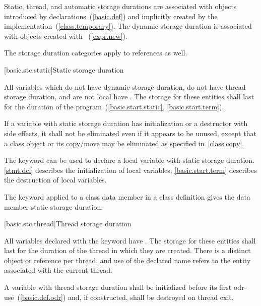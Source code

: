\pnum
{}%
%
%
%
Static, thread, and automatic storage durations are associated with objects
introduced by declarations~(\ref{basic.def}) and implicitly created by
the implementation~(\ref{class.temporary}). The dynamic storage duration
is associated with objects created with 
~(\ref{expr.new}).

\pnum
The storage duration categories apply to references as well.

[basic.stc.static]{Static storage duration}

\pnum
{}%
All variables which do not have dynamic storage duration, do not have thread
storage duration, and are not local
have . The
storage for these entities shall last for the duration of the
program~(\ref{basic.start.static}, \ref{basic.start.term}).

\pnum
If a variable with static storage duration has initialization or a
destructor with side effects, it shall not be eliminated even if it
appears to be unused, except that a class object or its copy/move may be
eliminated as specified in~\ref{class.copy}.

\pnum
{}%
The keyword  can be used to declare a local variable with
static storage duration. \enternote \ref{stmt.dcl} describes the
initialization of local  variables; \ref{basic.start.term}
describes the destruction of local  variables. \exitnote

\pnum
{}%
The keyword  applied to a class data member in a class
definition gives the data member static storage duration.

[basic.stc.thread]{Thread storage duration}

\pnum
{}%
All variables declared with the  keyword have . The storage for these entities shall last for the duration of
the thread in which they are created. There is a distinct object or reference
per thread, and use of the declared name refers to the entity associated with
the current thread.

\pnum
A variable with thread storage duration shall be initialized before
its first odr-use~(\ref{basic.def.odr}) and, if constructed, shall be destroyed on thread exit.

